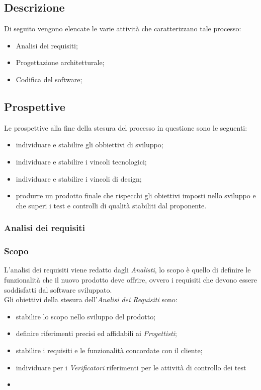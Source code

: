 \subsection{Descrizione}
Di seguito vengono elencate le varie attività che caratterizzano tale processo:
\begin{itemize}
	\item Analisi dei requisiti;
	\item Progettazione architetturale;
	\item Codifica del software;
\end{itemize}
\subsection{Prospettive}
Le prospettive alla fine della stesura del processo in questione sono le seguenti:
\begin{itemize}
	\item individuare e stabilire gli obbiettivi di sviluppo;
	\item individuare e stabilire i vincoli tecnologici;
	\item individuare e stabilire i vincoli di design;
	\item produrre un prodotto finale che rispecchi gli obiettivi imposti nello sviluppo e che superi i test e controlli di qualità stabiliti dal proponente.
\end{itemize}
\subsubsection{Analisi dei requisiti}
\subsubsection{Scopo}
L'analisi dei requisiti viene redatto dagli \emph{Analisti}, lo scopo è quello di definire le funzionalità che il nuovo prodotto deve offrire, ovvero i requisiti che devono essere soddisfatti dal software sviluppato.\\
Gli obiettivi della stesura dell'\emph{Analisi dei Requisiti} sono:
\begin{itemize}
	\item stabilire lo scopo nello sviluppo del prodotto;
	\item definire riferimenti precisi ed affidabili ai \emph{Progettisti};
	\item stabilire i requisiti e le funzionalità concordate con il cliente;
	\item individuare per i \emph{Verificatori} riferimenti per le attività di controllo dei test
	\item 
\end{itemize}
